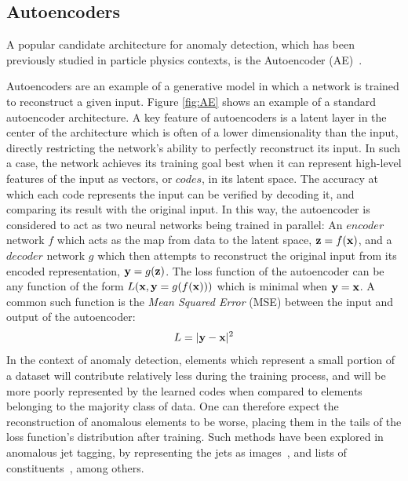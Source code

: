 \documentclass[12pt, a4paper]{article}
\begin{document}
\subsection{Autoencoders}

A popular candidate architecture for anomaly detection, which has been previously studied in particle physics contexts, is the Autoencoder (AE)~\cite{bank2020autoencoders, Farina_2020}.

Autoencoders are an example of a generative model in which a network is trained to reconstruct a given input. 
Figure \ref{fig:AE} shows an example of a standard autoencoder architecture.
A key feature of autoencoders is a latent layer in the center of the architecture which is often of a lower dimensionality than the input, directly restricting the network's ability to perfectly reconstruct its input. 
In such a case, the network achieves its training goal best when it can represent high-level features of the input as vectors, or $codes$, in its latent space. 
The accuracy at which each code represents the input can be verified by decoding it, and comparing
its result with the original input. In this way, the autoencoder is considered
to act as two neural networks being trained in parallel: An $encoder$ network $f$
which acts as the map from data to the latent space, ${\textbf z}=f({\textbf x})$, and
a $decoder$ network $g$ which then attempts to reconstruct the original input from 
its encoded representation, ${\textbf y}=g({\textbf z})$. The loss function of the
autoencoder can be any function of the form $L({\textbf x}, {\textbf y}=g(f({\textbf x})))$ which 
is minimal when ${\textbf y}={\textbf x}$. A common such function is the {\it Mean Squared Error} (MSE)
between the input and output of the autoencoder:
\[L=|{\textbf y} - {\textbf x}|^2\]
In the context of anomaly detection, elements which represent a small portion of
a dataset will contribute relatively less during the training process, and will
be more poorly represented by the learned codes when compared to elements belonging to the majority class of data. One
can therefore expect the reconstruction of anomalous elements to be worse, placing them in the
tails of the loss function's distribution after training. Such methods have been 
explored in anomalous jet tagging, by representing the jets as images~\cite{Farina_2020}, and lists 
of constituents~\cite{Heimel_2019}, among others. 
\end{document}
